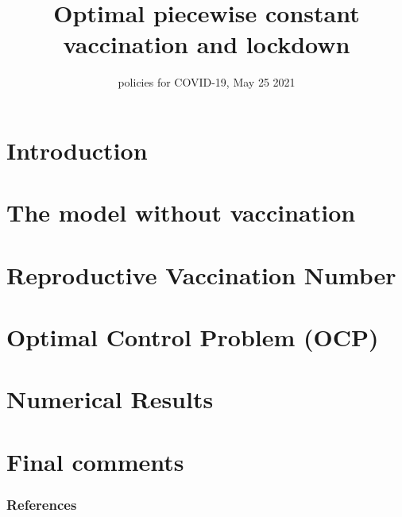\documentclass[9pt]{beamer}
\title{\LARGE{Optimal piecewise constant vaccination and lockdown }}
\subtitle{%
    policies for COVID-19, May 25 2021 
}
\begin{document}
    \titlepage
    \section*{Introduction}
        
    \section{The model without vaccination}
        
        
    \section{Reproductive Vaccination Number}
         
     \section{Optimal Control Problem (OCP)}
         
     \section{Numerical Results}
         
     \section{Final comments}
         
     \begin{frame}[allowframebreaks]
         \frametitle{References}
         
         
     \end{frame}
\end{document}
